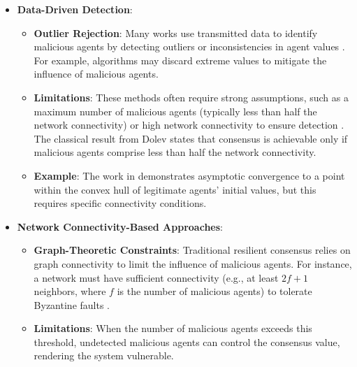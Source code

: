 \documentclass{article}
\begin{document}
\begin{enumerate}
    \begin{itemize}
        \item \textbf{Data-Driven Detection}:
        \begin{itemize}
            \item \textbf{Outlier Rejection}: Many works use transmitted data to identify malicious agents by detecting outliers or inconsistencies in agent values \cite{ref8}. For example, algorithms may discard extreme values to mitigate the influence of malicious agents.
            \item \textbf{Limitations}: These methods often require strong assumptions, such as a maximum number of malicious agents (typically less than half the network connectivity) or high network connectivity to ensure detection \cite{ref1,ref5,ref6}. The classical result from Dolev \cite{ref1} states that consensus is achievable only if malicious agents comprise less than half the network connectivity.
            \item \textbf{Example}: The work in \cite{ref8} demonstrates asymptotic convergence to a point within the convex hull of legitimate agents' initial values, but this requires specific connectivity conditions.
        \end{itemize}
        
        \item \textbf{Network Connectivity-Based Approaches}:
        \begin{itemize}
            \item \textbf{Graph-Theoretic Constraints}: Traditional resilient consensus relies on graph connectivity to limit the influence of malicious agents. For instance, a network must have sufficient connectivity (e.g., at least $2f+1$ neighbors, where $f$ is the number of malicious agents) to tolerate Byzantine faults \cite{ref1}.
            \item \textbf{Limitations}: When the number of malicious agents exceeds this threshold, undetected malicious agents can control the consensus value, rendering the system vulnerable.
        \end{itemize}
        

\end{itemize}
\end{enumerate}
\end{document}
